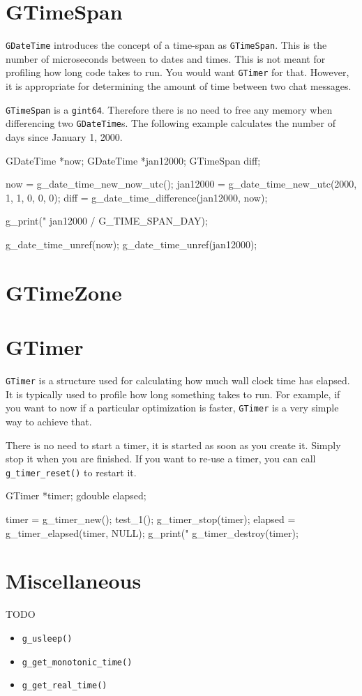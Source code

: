 \section{GTimeSpan}

\verb|GDateTime| introduces the concept of a time-span as \verb|GTimeSpan|.
This is the number of microseconds between to dates and times.
This is not meant for profiling how long code takes to run.
You would want \verb|GTimer| for that.
However, it is appropriate for determining the amount of time between two chat messages.

\verb|GTimeSpan| is a \verb|gint64|.
Therefore there is no need to free any memory when differencing two \verb|GDateTime|s.
The following example calculates the number of days since January 1, 2000.

\begin{code}{}
GDateTime *now;
GDateTime *jan12000;
GTimeSpan diff;

now = g_date_time_new_now_utc();
jan12000 = g_date_time_new_utc(2000, 1, 1, 0, 0, 0);
diff = g_date_time_difference(jan12000, now);

g_print("%
        jan12000 / G_TIME_SPAN_DAY);

g_date_time_unref(now);
g_date_time_unref(jan12000);
\end{code}


\section{GTimeZone}


\section{GTimer}

\verb|GTimer| is a structure used for calculating how much wall clock time has elapsed.
It is typically used to profile how long something takes to run.
For example, if you want to now if a particular optimization is faster, \verb|GTimer| is a very simple way to achieve that.

There is no need to start a timer, it is started as soon as you create it.
Simply stop it when you are finished.
If you want to re-use a timer, you can call \verb|g_timer_reset()| to restart it.

\begin{code}{}
GTimer *timer;
gdouble elapsed;

timer = g_timer_new();
test_1();
g_timer_stop(timer);
elapsed = g_timer_elapsed(timer, NULL);
g_print("%
g_timer_destroy(timer);

\end{code}


\section{Miscellaneous}

TODO

\begin{itemize}
\item \verb|g_usleep()|
\item \verb|g_get_monotonic_time()|
\item \verb|g_get_real_time()|
\end{itemize}

